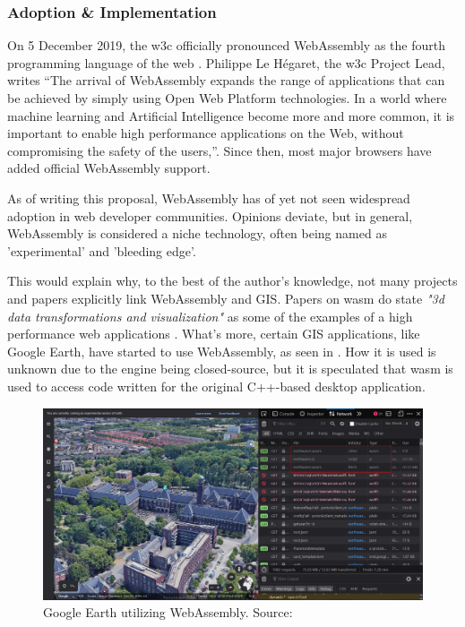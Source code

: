 \subsubsection*{Adoption \& Implementation}


On 5 December 2019, the \ac{w3c} officially pronounced WebAssembly as the fourth programming language of the web \cite{w3c_world_2019}. Philippe Le Hégaret, the \ac{w3c} Project Lead, writes “The arrival of WebAssembly expands the range of applications that can be achieved by simply using Open Web Platform technologies. In a world where machine learning and Artificial Intelligence become more and more common, it is important to enable high performance applications on the Web, without compromising the safety of the users,”. Since then, most major browsers have added official WebAssembly support.

As of writing this proposal, WebAssembly has of yet not seen widespread adoption in web developer communities. Opinions deviate, but in general, WebAssembly is considered a niche technology, often being named as 'experimental' and 'bleeding edge'. 

This would explain why, to the best of the author's knowledge, not many projects and papers explicitly link WebAssembly and GIS. Papers on \ac{wasm} do state \textit{"3d data transformations and visualization"} as some of the examples of a high performance web applications \cite{haas_bringing_2017, jangda_not_2019}. What's more, certain GIS applications, like Google Earth, have started to use WebAssembly, as seen in  \cite{google_google_2020}. How it is used is unknown due to the engine being closed-source, but it is speculated that \ac{wasm} is used to access code written for the original C++-based desktop application.

\begin{figure}[!tbp]
  \centering
  \begin{minipage}[b]{0.80\textwidth}
    \includegraphics[width=\textwidth]{../images/google-earth-uses-webassembly.PNG}
    \caption{Google Earth utilizing WebAssembly. Source: \cite{google_google_2020}}
    \label{fig:google-earth}
  \end{minipage}
\end{figure}

